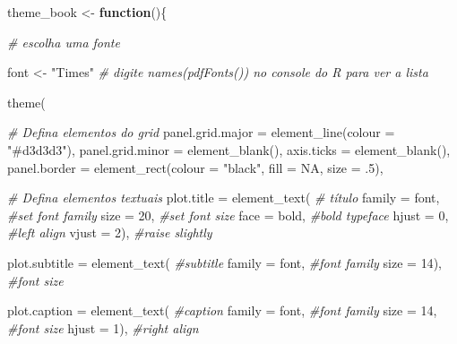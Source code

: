 \documentclass[
]{book}
\newenvironment{Shaded}{\begin{snugshade}}{\end{snugshade}}
\newcommand{\AttributeTok}[1]{\textcolor[rgb]{0.61,0.61,0.61}{#1}}
\newcommand{\CommentTok}[1]{\textcolor[rgb]{0.37,0.37,0.37}{\textit{#1}}}
\newcommand{\ConstantTok}[1]{\textcolor[rgb]{0,0,0}{#1}}
\newcommand{\ControlFlowTok}[1]{\textcolor[rgb]{0.27,0.27,0.27}{\textbf{#1}}}
\newcommand{\DecValTok}[1]{\textcolor[rgb]{0.06,0.06,0.06}{#1}}
\newcommand{\FunctionTok}[1]{\textcolor[rgb]{0,0,0}{#1}}
\newcommand{\NormalTok}[1]{#1}
\newcommand{\OtherTok}[1]{\textcolor[rgb]{0.37,0.37,0.37}{#1}}
\newcommand{\StringTok}[1]{\textcolor[rgb]{0.5,0.5,0.5}{#1}}
\begin{document}
\begin{Shaded}
\begin{Highlighting}[]

\NormalTok{theme\_book }\OtherTok{\textless{}{-}} \ControlFlowTok{function}\NormalTok{()\{}

\CommentTok{\# escolha uma fonte}

\NormalTok{font }\OtherTok{\textless{}{-}} \StringTok{"Times"} \CommentTok{\# digite names(pdfFonts()) no console do R para ver a lista}

\FunctionTok{theme}\NormalTok{(}
  
  \CommentTok{\# Defina elementos do grid}
  \AttributeTok{panel.grid.major =} \FunctionTok{element\_line}\NormalTok{(}\AttributeTok{colour =} \StringTok{"\#d3d3d3"}\NormalTok{),  }
  \AttributeTok{panel.grid.minor =} \FunctionTok{element\_blank}\NormalTok{(),}
  \AttributeTok{axis.ticks =} \FunctionTok{element\_blank}\NormalTok{(), }
  \AttributeTok{panel.border =} \FunctionTok{element\_rect}\NormalTok{(}\AttributeTok{colour =} \StringTok{"black"}\NormalTok{,}
                              \AttributeTok{fill =} \ConstantTok{NA}\NormalTok{, }
                              \AttributeTok{size =}\NormalTok{ .}\DecValTok{5}\NormalTok{),}
  
  \CommentTok{\# Defina elementos textuais}
  \AttributeTok{plot.title =} \FunctionTok{element\_text}\NormalTok{(             }\CommentTok{\# título}
    \AttributeTok{family =}\NormalTok{ font,            }\CommentTok{\#set font family}
    \AttributeTok{size =} \DecValTok{20}\NormalTok{,                }\CommentTok{\#set font size}
    \AttributeTok{face =} \StringTok{\textquotesingle{}bold\textquotesingle{}}\NormalTok{,            }\CommentTok{\#bold typeface}
    \AttributeTok{hjust =} \DecValTok{0}\NormalTok{,                }\CommentTok{\#left align}
    \AttributeTok{vjust =} \DecValTok{2}\NormalTok{),               }\CommentTok{\#raise slightly}
  
  \AttributeTok{plot.subtitle =} \FunctionTok{element\_text}\NormalTok{(          }\CommentTok{\#subtitle}
    \AttributeTok{family =}\NormalTok{ font,            }\CommentTok{\#font family}
    \AttributeTok{size =} \DecValTok{14}\NormalTok{),               }\CommentTok{\#font size}
  
  \AttributeTok{plot.caption =} \FunctionTok{element\_text}\NormalTok{(           }\CommentTok{\#caption}
    \AttributeTok{family =}\NormalTok{ font,            }\CommentTok{\#font family}
    \AttributeTok{size =} \DecValTok{14}\NormalTok{,                }\CommentTok{\#font size}
    \AttributeTok{hjust =} \DecValTok{1}\NormalTok{),               }\CommentTok{\#right align}
  

\end{Highlighting}
\end{Shaded}
\end{document}
